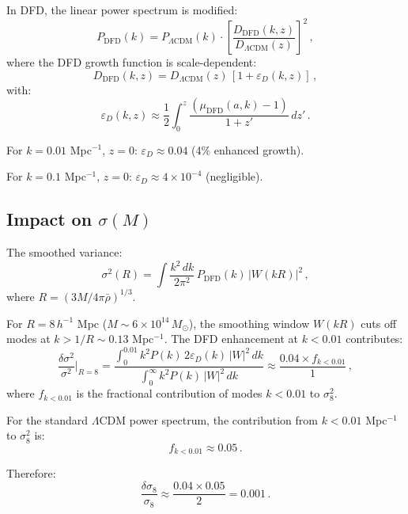 \documentclass[11pt,a4paper]{article}
\begin{document}
In DFD, the linear power spectrum is modified:
\begin{equation}
P_{\mathrm{DFD}}(k) = P_{\Lambda\mathrm{CDM}}(k) \cdot \left[\frac{D_{\mathrm{DFD}}(k,z)}{D_{\Lambda\mathrm{CDM}}(z)}\right]^2\,,
\end{equation}
where the DFD growth function is scale-dependent:
\begin{equation}
D_{\mathrm{DFD}}(k,z) = D_{\Lambda\mathrm{CDM}}(z)\,\left[1 + \varepsilon_D(k,z)\right]\,,
\end{equation}
with:
\begin{equation}
\varepsilon_D(k,z) \approx \frac{1}{2}\int_0^z \frac{(\mu_{\mathrm{DFD}}(a,k) - 1)}{1+z'}\,dz'\,.
\end{equation}

For $k = 0.01$ Mpc$^{-1}$, $z = 0$: $\varepsilon_D \approx 0.04$ (4\% enhanced growth).

For $k = 0.1$ Mpc$^{-1}$, $z = 0$: $\varepsilon_D \approx 4 \times 10^{-4}$ (negligible).

\subsection{Impact on $\sigma(M)$}

The smoothed variance:
\begin{equation}
\sigma^2(R) = \int \frac{k^2\,dk}{2\pi^2}\,P_{\mathrm{DFD}}(k)\,|W(kR)|^2\,,
\end{equation}
where $R = (3M/4\pi\bar{\rho})^{1/3}$.

For $R = 8\,h^{-1}$ Mpc ($M \sim 6 \times 10^{14}\,M_\odot$), the smoothing window $W(kR)$ cuts off modes at $k > 1/R \sim 0.13$ Mpc$^{-1}$. The DFD enhancement at $k < 0.01$ contributes:
\begin{equation}
\frac{\delta\sigma^2}{\sigma^2}\bigg|_{R=8} = \frac{\int_0^{0.01} k^2 P(k)\,2\varepsilon_D(k)\,|W|^2\,dk}{\int_0^\infty k^2 P(k)\,|W|^2\,dk} \approx \frac{0.04 \times f_{k<0.01}}{1}\,,
\end{equation}
where $f_{k<0.01}$ is the fractional contribution of modes $k < 0.01$ to $\sigma_8^2$.

For the standard $\Lambda$CDM power spectrum, the contribution from $k < 0.01$ Mpc$^{-1}$ to $\sigma_8^2$ is:
\begin{equation}
f_{k<0.01} \approx 0.05\,.
\end{equation}

Therefore:
\begin{equation}
\frac{\delta\sigma_8}{\sigma_8} \approx \frac{0.04 \times 0.05}{2} = 0.001\,.
\end{equation}
\end{document}
